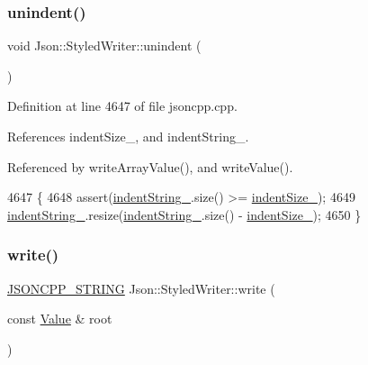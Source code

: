 \subsubsection{\texorpdfstring{unindent()}{unindent()}}
{\footnotesize\ttfamily void Json\+::\+Styled\+Writer\+::unindent (\begin{DoxyParamCaption}{ }\end{DoxyParamCaption})\hspace{0.3cm}{\ttfamily [private]}}



Definition at line 4647 of file jsoncpp.\+cpp.



References indent\+Size\+\_\+, and indent\+String\+\_\+.



Referenced by write\+Array\+Value(), and write\+Value().


\begin{DoxyCode}
4647                             \{
4648   assert(\hyperlink{class_json_1_1_styled_writer_a7d91709c94c152bd44eaf80faac130ae}{indentString\_}.size() >= \hyperlink{class_json_1_1_styled_writer_a0b5ab768cc56433d463eb1f03da8614e}{indentSize\_});
4649   \hyperlink{class_json_1_1_styled_writer_a7d91709c94c152bd44eaf80faac130ae}{indentString\_}.resize(\hyperlink{class_json_1_1_styled_writer_a7d91709c94c152bd44eaf80faac130ae}{indentString\_}.size() - 
      \hyperlink{class_json_1_1_styled_writer_a0b5ab768cc56433d463eb1f03da8614e}{indentSize\_});
4650 \}
\end{DoxyCode}
\mbox{\label{class_json_1_1_styled_writer_a5efab19b9746da9920c29cdae3a6b404}} 
\subsubsection{\texorpdfstring{write()}{write()}}
{\footnotesize\ttfamily \hyperlink{json_8h_a1e723f95759de062585bc4a8fd3fa4be}{J\+S\+O\+N\+C\+P\+P\+\_\+\+S\+T\+R\+I\+NG} Json\+::\+Styled\+Writer\+::write (\begin{DoxyParamCaption}\item[{const \hyperlink{class_json_1_1_value}{Value} \&}]{root }\end{DoxyParamCaption})\hspace{0.3cm}{\ttfamily [virtual]}}



